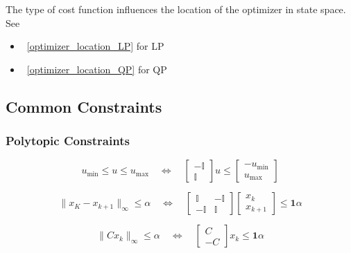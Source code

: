 \newpar{}

The type of cost function influences the location of the optimizer in state space. See
\begin{itemize}
    \item\ \ref{optimizer_location_LP} for LP
    \item\ \ref{optimizer_location_QP} for QP
\end{itemize}

\subsection{Common Constraints}
\subsubsection{Polytopic Constraints}
\begin{equation*}
    u_{\min} \leq u \leq u_{\max} \quad \Leftrightarrow \quad \begin{bmatrix}
        -\mathbb{I} \\
        \mathbb{I}
    \end{bmatrix} u \leq \begin{bmatrix}
        -u_{\min} \\
        u_{\max}
    \end{bmatrix}
\end{equation*}

\newpar{}
\begin{equation*}
    \|x_K - x_{k+1}\|_\infty \leq \alpha \quad \Leftrightarrow \quad \begin{bmatrix}
        \mathbb{I}  & -\mathbb{I} \\
        -\mathbb{I} & \mathbb{I}
    \end{bmatrix}\begin{bmatrix}
        x_k \\
        x_{k+1}
    \end{bmatrix} \leq \bm{1} \alpha
\end{equation*}

\newpar{}

\begin{equation*}
    \|C x_k\|_\infty \leq \alpha \quad \Leftrightarrow \quad \begin{bmatrix}
        C \\ -C
    \end{bmatrix} x_k \leq \bm{1} \alpha
\end{equation*}